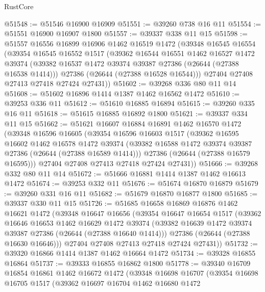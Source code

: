 \begin{lexlean}{RustCore}
\begin{coremodule}
@51548 := @51546 @16900 @16909
@51551 := @39260 @738 @16 @11
@51554 := @51551 @16900 @16907 @1800
@51557 := @39337 @338 @11 @15
@51598 := @51557
    @16556
    @16899
    @16906
    @1462
    @16519
    @1472
    (@39348
      @16545
      @16554
      (@39354
        @16545
        @16552
        @1517
        (@39362
          @16544
          @16551
          @1462
          @16527
          @1472
          @39374
          (@39382 @16537 @1472 @39374 @39387 @27386 (@26644 (@27388 @16538 @1414)))
          @27386
          (@26644 (@27388 @16528 @16544)))
        @27404
        @27408
        @27413
        @27418
        @27424
        @27431))
@51602 := @39268 @336 @80 @11 @14
@51608 := @51602 @16896 @1414 @1387 @1462 @16562 @1472
@51610 := @39253 @336 @11
@51612 := @51610 @16885 @16894
@51615 := @39260 @335 @16 @11
@51618 := @51615 @16885 @16892 @1800
@51621 := @39337 @334 @11 @15
@51662 := @51621
    @16607
    @16884
    @16891
    @1462
    @16570
    @1472
    (@39348
      @16596
      @16605
      (@39354
        @16596
        @16603
        @1517
        (@39362
          @16595
          @16602
          @1462
          @16578
          @1472
          @39374
          (@39382 @16588 @1472 @39374 @39387 @27386 (@26644 (@27388 @16589 @1414)))
          @27386
          (@26644 (@27388 @16579 @16595)))
        @27404
        @27408
        @27413
        @27418
        @27424
        @27431))
@51666 := @39268 @332 @80 @11 @14
@51672 := @51666 @16881 @1414 @1387 @1462 @16613 @1472
@51674 := @39253 @332 @11
@51676 := @51674 @16870 @16879
@51679 := @39260 @331 @16 @11
@51682 := @51679 @16870 @16877 @1800
@51685 := @39337 @330 @11 @15
@51726 := @51685
    @16658
    @16869
    @16876
    @1462
    @16621
    @1472
    (@39348
      @16647
      @16656
      (@39354
        @16647
        @16654
        @1517
        (@39362
          @16646
          @16653
          @1462
          @16629
          @1472
          @39374
          (@39382 @16639 @1472 @39374 @39387 @27386 (@26644 (@27388 @16640 @1414)))
          @27386
          (@26644 (@27388 @16630 @16646)))
        @27404
        @27408
        @27413
        @27418
        @27424
        @27431))
@51732 := @39320 @16866 @1414 @1387 @1462 @16664 @1472
@51734 := @39328 @16855 @16864
@51737 := @39333 @16855 @16862 @1800
@51778 := @39340
    @16709
    @16854
    @16861
    @1462
    @16672
    @1472
    (@39348
      @16698
      @16707
      (@39354
        @16698
        @16705
        @1517
        (@39362
          @16697
          @16704
          @1462
          @16680
          @1472

\end{coremodule}
\end{lexlean}
